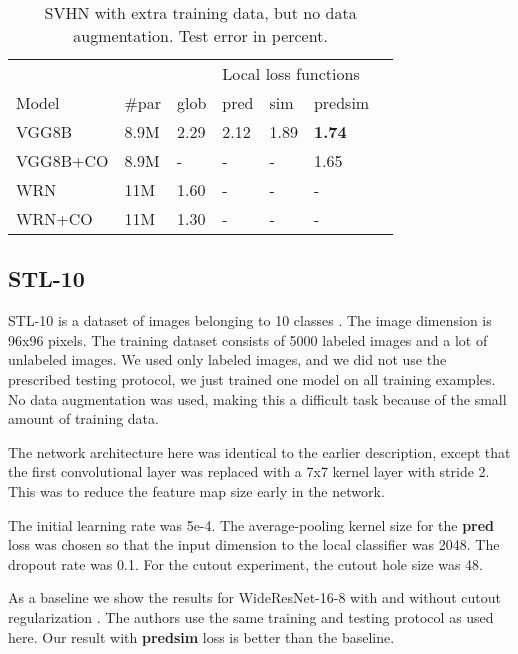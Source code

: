 \documentclass{article}
\begin{document}
\begin{table}[h]
  \caption{SVHN with extra training data, but no data augmentation. Test error in percent.}
  \label{table:svhn}
  \centering
  \begin{tabular}{lllllll}
    \toprule
    &&& \multicolumn{3}{|l}{Local loss functions} \\
    Model   & \#par & glob & \multicolumn{1}{|l}{pred} & sim & \multicolumn{1}{l}{predsim}  \\
    \midrule
    VGG8B & 8.9M &  2.29 & \multicolumn{1}{|l}{2.12} & 1.89  & \textbf{1.74} \\
    VGG8B+CO & 8.9M &  - & \multicolumn{1}{|l}{-} & -  & 1.65 \\
    \midrule
    WRN & 11M & 1.60  & \multicolumn{1}{|l}{-} & - & - \\
    WRN+CO & 11M & 1.30  & \multicolumn{1}{|l}{-} & - & - \\
    \bottomrule
  \end{tabular}
\end{table}

\subsection{STL-10}

STL-10 is a dataset of images belonging to 10 classes \cite{CoatesNL11}. The image dimension is 96x96 pixels. The training dataset consists of 5000 labeled images and a lot of unlabeled images. We used only labeled images, and we did not use the prescribed testing protocol, we just trained one model on all training examples. No data augmentation was used, making this a difficult task because of the small amount of training data. 

The network architecture here was identical to the earlier description, except that the first convolutional layer was replaced with a 7x7 kernel layer with stride 2. This was to reduce the feature map size early in the network. 

The initial learning rate was 5e-4. The average-pooling kernel size for the \textbf{pred} loss was chosen so that the input dimension to the local classifier was 2048. The dropout rate was 0.1. For the cutout experiment, the cutout hole size was 48.

As a baseline we show the results for WideResNet-16-8 with and without cutout regularization \cite{DevriesT17}. The authors use the same training and testing protocol as used here. Our result with \textbf{predsim} loss is better than the baseline.
\end{document}
